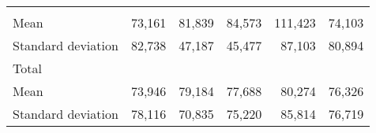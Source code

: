 \begin{tabular}{llllll}
  \multicolumn{1}{|r}{} &
  \multicolumn{1}{r}{} &
  \multicolumn{1}{r}{} &
  \multicolumn{1}{r}{} &
  \multicolumn{1}{r}{} \\
\multicolumn{1}{l}{\hspace{4em}Mean} &
  \multicolumn{1}{|r}{73,161} &
  \multicolumn{1}{r}{81,839} &
  \multicolumn{1}{r}{84,573} &
  \multicolumn{1}{r}{111,423} &
  \multicolumn{1}{r}{74,103} \\
\multicolumn{1}{l}{\hspace{4em}Standard deviation} &
  \multicolumn{1}{|r}{82,738} &
  \multicolumn{1}{r}{47,187} &
  \multicolumn{1}{r}{45,477} &
  \multicolumn{1}{r}{87,103} &
  \multicolumn{1}{r}{80,894} \\
\multicolumn{1}{l}{\hspace{3em}Total} &
  \multicolumn{1}{|r}{} &
  \multicolumn{1}{r}{} &
  \multicolumn{1}{r}{} &
  \multicolumn{1}{r}{} &
  \multicolumn{1}{r}{} \\
\multicolumn{1}{l}{\hspace{4em}Mean} &
  \multicolumn{1}{|r}{73,946} &
  \multicolumn{1}{r}{79,184} &
  \multicolumn{1}{r}{77,688} &
  \multicolumn{1}{r}{80,274} &
  \multicolumn{1}{r}{76,326} \\
\multicolumn{1}{l}{\hspace{4em}Standard deviation} &
  \multicolumn{1}{|r}{78,116} &
  \multicolumn{1}{r}{70,835} &
  \multicolumn{1}{r}{75,220} &
  \multicolumn{1}{r}{85,814} &
  \multicolumn{1}{r}{76,719} \\
\cline{1-6}
\end{tabular}

